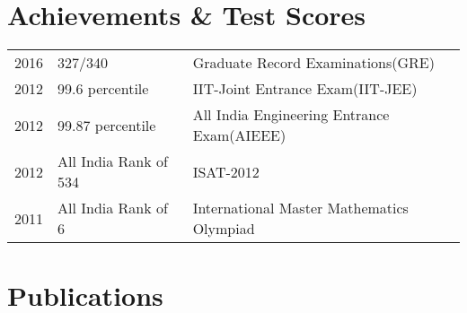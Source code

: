 \documentclass[]{deedy-resume-openfont}
\begin{document}
\begin{minipage}[t]{0.66\textwidth}
\section{Achievements \& Test Scores} 
\begin{tabular}{rll}
2016         & 327/340 & Graduate Record Examinations(GRE)\\
2012	     & 99.6 percentile  & IIT-Joint Entrance Exam(IIT-JEE)\\
2012	     & 99.87 percentile  & All India Engineering Entrance Exam(AIEEE)\\
2012	     & All India Rank of 534  & ISAT-2012\\
2011     & All India Rank of 6 & International Master Mathematics Olympiad\\
\end{tabular}
\sectionsep


\section{Publications}
\vspace{\topsep}
\vspace{\topsep}


\nocite{*}
\sectionsep

\end{minipage} 
\end{document}
